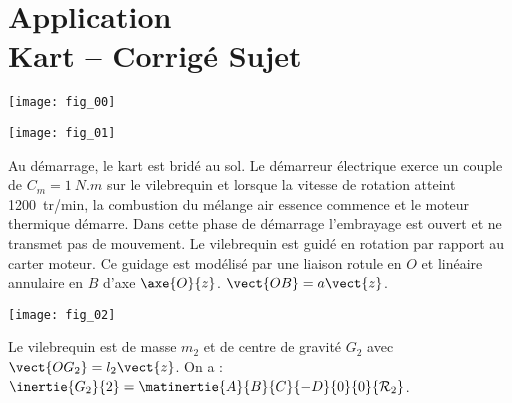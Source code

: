 \chapter*{Application  \\ 
Kart -- \ifprof Corrigé \else Sujet \fi}

\iflivret {} \else
\ifprof  {} \else \fi
\fi

\setcounter{question}{0}
\begin{marginfigure}[3cm]
\texttt{[image: fig\_00]}
\end{marginfigure}




\ifprof
\else

\begin{marginfigure}[6cm]
\texttt{[image: fig\_01]}
\end{marginfigure}

Au démarrage, le kart est bridé au sol. Le démarreur électrique exerce un couple de $C_m = \SI{1}{N.m}$ sur le vilebrequin et lorsque la vitesse de rotation atteint \SI{1200}{tr/min}, la combustion du mélange air essence commence et le moteur thermique démarre. Dans cette phase de démarrage l’embrayage est ouvert et ne transmet pas de mouvement.
Le vilebrequin est guidé en rotation par rapport au carter moteur. Ce guidage est modélisé par une liaison rotule en $O$ et linéaire annulaire en $B$ d’axe $\axe{O}{z}$. $\vect{OB}=a\vect{z}$.


\begin{marginfigure}[8cm]
\texttt{[image: fig\_02]}
\end{marginfigure}

Le vilebrequin est de masse $m_2$ et de centre de gravité $G_2$ avec $\vect{OG_2}=l_2\vect{z}$. On a : $\inertie{G_2}{2}=\matinertie{A}{B}{C}{-D}{0}{0}{\mathcal{R}_2}$.




